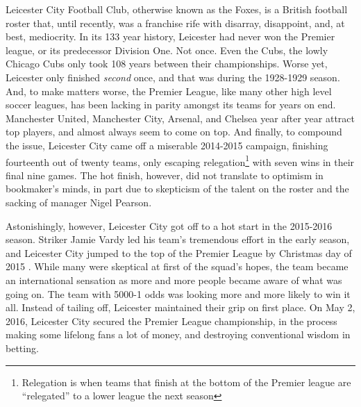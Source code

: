 \documentclass[../../fulltext/fulltext.tex]{subfiles}
\begin{document}
Leicester City Football Club, otherwise known as the Foxes, is a British football roster that, until recently, was a franchise rife with disarray, disappoint, and, at best, mediocrity.  In its 133 year history, Leicester had never won the Premier league, or its predecessor Division One.  Not once.  Even the Cubs, the lowly Chicago Cubs only took 108 years between their championships.  Worse yet, Leicester only finished \emph{second} once, and that was during the 1928-1929 season.\cite{Leicester2}  And, to make matters worse, the Premier League, like many other high level soccer leagues, has been lacking in parity amongst its teams for years on end.  Manchester United, Manchester City, Arsenal, and Chelsea year after year attract top players, and almost always seem to come on top. And finally, to compound the issue, Leicester City came off a miserable 2014-2015 campaign, finishing fourteenth out of twenty teams, only escaping relegation\footnote{Relegation is when teams that finish at the bottom of the Premier league are ``relegated'' to a lower league the next season} with seven wins in their final nine games.\cite{Leicester3}  
The hot finish, however, did not translate to optimism in bookmaker's minds, in part due to skepticism of the talent on the roster and the sacking of manager Nigel Pearson.

Astonishingly, however, Leicester City got off to a hot start in the 2015-2016 season. Striker Jamie Vardy  led his team's tremendous effort in the early season, and Leicester City jumped to the top of the Premier League by Christmas day of 2015
.  While many were skeptical at first of the squad's hopes, the team became an international sensation as more and more people became aware of what was going on.  The team with 5000-1 odds was looking more and more likely to win it all.  Instead of tailing off, Leicester maintained their grip on first place.  On May 2, 2016, Leicester City secured the Premier League championship, in the process making some lifelong fans a lot of money, and destroying conventional wisdom in betting. 
\end{document}
